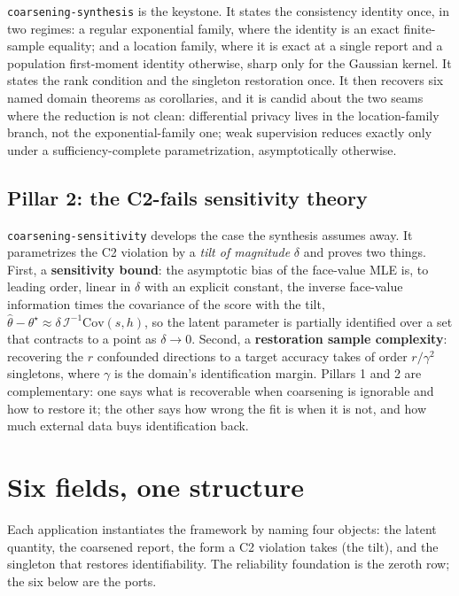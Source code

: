 \documentclass[11pt]{article}
\begin{document}
\texttt{coarsening-synthesis} is the keystone. It states the consistency identity
once, in two regimes: a regular exponential family, where the identity is an exact
finite-sample equality; and a location family, where it is exact at a single report
and a population first-moment identity otherwise, sharp only for the Gaussian
kernel. It states the rank condition and the singleton restoration once. It then
recovers six named domain theorems as corollaries, and it is candid about the two
seams where the reduction is not clean: differential privacy lives in the
location-family branch, not the exponential-family one; weak supervision reduces
exactly only under a sufficiency-complete parametrization, asymptotically otherwise.

\subsection{Pillar 2: the C2-fails sensitivity theory}

\texttt{coarsening-sensitivity} develops the case the synthesis assumes away. It
parametrizes the C2 violation by a \emph{tilt of magnitude} $\delta$ and proves two
things. First, a \textbf{sensitivity bound}: the asymptotic bias of the face-value
MLE is, to leading order, linear in $\delta$ with an explicit constant, the inverse
face-value information times the covariance of the score with the tilt,
$\hat\theta - \theta^\star \approx \delta\,\mathcal{I}^{-1}\mathrm{Cov}(s,h)$, so
the latent parameter is partially identified over a set that contracts to a point as
$\delta \to 0$. Second, a \textbf{restoration sample complexity}: recovering the $r$
confounded directions to a target accuracy takes of order $r/\gamma^2$ singletons,
where $\gamma$ is the domain's identification margin. Pillars 1 and 2 are
complementary: one says what is recoverable when coarsening is ignorable and how to
restore it; the other says how wrong the fit is when it is not, and how much
external data buys identification back.

\section{Six fields, one structure}

Each application instantiates the framework by naming four objects: the latent
quantity, the coarsened report, the form a C2 violation takes (the tilt), and the
singleton that restores identifiability. The reliability foundation is the zeroth
row; the six below are the ports.
\end{document}
